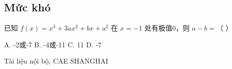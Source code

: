 \documentclass[11pt, a4paper]{article}
\begin{document}
\subsection{Mức khó}

\begin{baitap}[10]
已知 $f(x) = x^3 + 3ax^2 + bx + a^2$ 在 $x = -1$ 处有极值0，则 $a - b =$（ ）
\par\vspace{3pt}
\noindent A. -2或-7 \quad B. -4或-11 \quad C. 11 \quad D. -7
\end{baitap}
\vspace{0.8cm}
\begin{center}
{\footnotesize\color{cae_blue} Tài liệu nội bộ, CAE SHANGHAI}
\end{center}
\end{document}

